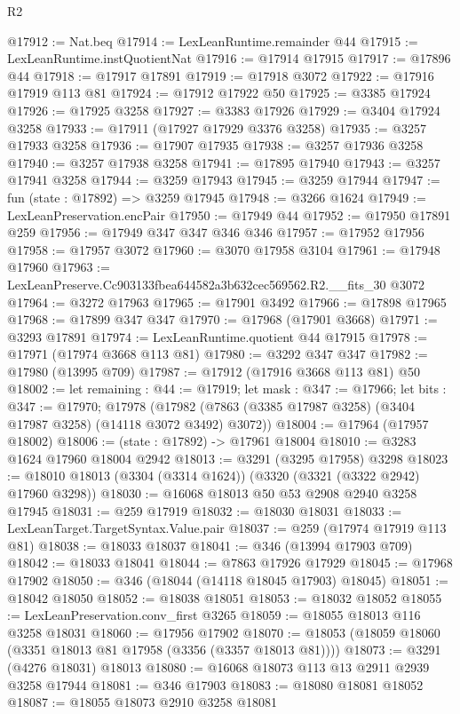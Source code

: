 \begin{lexlean}{R2}
\begin{coremodule}
@17912 := Nat.beq
@17914 := LexLeanRuntime.remainder @44
@17915 := LexLeanRuntime.instQuotientNat
@17916 := @17914 @17915
@17917 := @17896 @44
@17918 := @17917 @17891
@17919 := @17918 @3072
@17922 := @17916 @17919 @113 @81
@17924 := @17912 @17922 @50
@17925 := @3385 @17924
@17926 := @17925 @3258
@17927 := @3383 @17926
@17929 := @3404 @17924 @3258
@17933 := @17911 (@17927 @17929 @3376 @3258)
@17935 := @3257 @17933 @3258
@17936 := @17907 @17935
@17938 := @3257 @17936 @3258
@17940 := @3257 @17938 @3258
@17941 := @17895 @17940
@17943 := @3257 @17941 @3258
@17944 := @3259 @17943
@17945 := @3259 @17944
@17947 := fun (state : @17892) => @3259 @17945
@17948 := @3266 @1624
@17949 := LexLeanPreservation.encPair
@17950 := @17949 @44
@17952 := @17950 @17891 @259
@17956 := @17949 @347 @347 @346 @346
@17957 := @17952 @17956
@17958 := @17957 @3072
@17960 := @3070 @17958 @3104
@17961 := @17948 @17960
@17963 := LexLeanPreserve.Cc903133fbea644582a3b632cec569562.R2.__fits_30 @3072
@17964 := @3272 @17963
@17965 := @17901 @3492
@17966 := @17898 @17965
@17968 := @17899 @347 @347
@17970 := @17968 (@17901 @3668)
@17971 := @3293 @17891
@17974 := LexLeanRuntime.quotient @44 @17915
@17978 := @17971 (@17974 @3668 @113 @81)
@17980 := @3292 @347 @347
@17982 := @17980 (@13995 @709)
@17987 := @17912 (@17916 @3668 @113 @81) @50
@18002 := let remaining : @44 := @17919;
  let mask : @347 := @17966;
  let bits : @347 := @17970;
  @17978 (@17982 (@7863 (@3385 @17987 @3258) (@3404 @17987 @3258) (@14118 @3072 @3492) @3072))
@18004 := @17964 (@17957 @18002)
@18006 := (state : @17892) -> @17961 @18004
@18010 := @3283 @1624 @17960 @18004 @2942
@18013 := @3291 (@3295 @17958) @3298
@18023 := @18010 @18013 (@3304 (@3314 @1624)) (@3320 (@3321 (@3322 @2942) @17960 @3298))
@18030 := @16068 @18013 @50 @53 @2908 @2940 @3258 @17945
@18031 := @259 @17919
@18032 := @18030 @18031
@18033 := LexLeanTarget.TargetSyntax.Value.pair
@18037 := @259 (@17974 @17919 @113 @81)
@18038 := @18033 @18037
@18041 := @346 (@13994 @17903 @709)
@18042 := @18033 @18041
@18044 := @7863 @17926 @17929
@18045 := @17968 @17902
@18050 := @346 (@18044 (@14118 @18045 @17903) @18045)
@18051 := @18042 @18050
@18052 := @18038 @18051
@18053 := @18032 @18052
@18055 := LexLeanPreservation.conv_first @3265
@18059 := @18055 @18013 @116 @3258 @18031
@18060 := @17956 @17902
@18070 := @18053 (@18059 @18060 (@3351 @18013 @81 @17958 (@3356 (@3357 @18013 @81))))
@18073 := @3291 (@4276 @18031) @18013
@18080 := @16068 @18073 @113 @13 @2911 @2939 @3258 @17944
@18081 := @346 @17903
@18083 := @18080 @18081 @18052
@18087 := @18055 @18073 @2910 @3258 @18081

\end{coremodule}
\end{lexlean}
